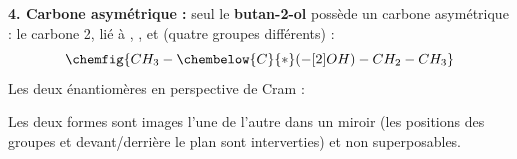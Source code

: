 \documentclass[11pt]{article}
\begin{document}
\begin{corrige}
\textbf{4. Carbone asymétrique :} seul le \textbf{butan-2-ol} possède un carbone asymétrique : le carbone 2, lié à , ,  et  (quatre groupes différents) :
\[ \chemfig{CH_3-\chembelow{C}{*}(-[2]OH)-CH_2-CH_3} \]
Les deux énantiomères en perspective de Cram :
\begin{center}
\end{center}
Les deux formes sont images l'une de l'autre dans un miroir (les positions des groupes  et  devant/derrière le plan sont interverties) et non superposables.
\end{corrige}
\end{document}
